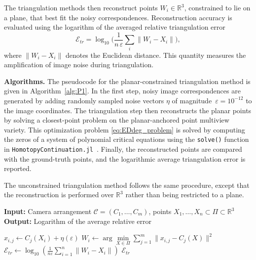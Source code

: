 \documentclass{article}
\begin{document}
The triangulation methods then reconstruct points $W_i \in \mathbb{R}^3$, constrained to lie on a plane, that best fit the noisy correspondences.
Reconstruction accuracy is evaluated using the logarithm of the averaged relative triangulation error
\[
\mathcal{E}_{tr}=\log_{10}\!\Bigg(\frac{1}{n\,\varepsilon}\sum_i\|W_i-X_i\|\Bigg),
\]
where $\|W_i-X_i\|$ denotes the Euclidean distance. This quantity measures the amplification of image noise during triangulation.

\textbf{Algorithms.} The pseudocode for the planar-constrained triangulation method is given in Algorithm~\ref{alg:P1}. In the first step, noisy image correspondences are generated by adding randomly sampled noise vectors $\eta$ of magnitude~\mbox{$\varepsilon=10^{-12}$} to the image coordinates. The triangulation step then reconstructs the planar points by solving a closest-point problem on the planar-anchored point multiview variety. This optimization problem \ref{eq:EDdeg_problem} is solved by computing the zeros of a system of polynomial critical equations using the \texttt{solve()} function in \texttt{HomotopyContinuation.jl}~\cite{HC.jl}. Finally, the reconstructed points are compared with the ground-truth points, and the logarithmic average triangulation error is reported.

The unconstrained triangulation method follows the same procedure, except that the reconstruction is performed over $\mathbb{R}^3$ rather than being restricted to a plane.
\begin{algorithm}
\caption{Method (P).C: Planar-constrained triangulation}
\label{alg:P1}
\textbf{Input:} Camera arrangement \( \mathcal{C} = (C_1,\dots,C_m) \), points \( X_1,\dots,X_n \subset \Pi \subset \mathbb{R}^3 \) \\
\textbf{Output:} Logarithm of the average relative error
\begin{algorithmic}[1]
    \STATE $x_{i,j} \leftarrow C_j(X_i) + \eta(\varepsilon)$
  \ENDFOR
\ENDFOR
{}
  \STATE $W_i \leftarrow
  \arg\min\limits_{X \in \Pi}
  \sum\limits_{j=1}^m \| x_{i,j} - C_j(X) \|^2$
\ENDFOR
\STATE $\mathcal{E}_{tr}\leftarrow \log_{10}\!\left( \frac{1}{n\varepsilon}
\sum\limits_{i=1}^n \|W_i - X_i\| \right)$
\RETURN $\mathcal{E}_{tr}$
\end{algorithmic}
\end{algorithm}
\end{document}
